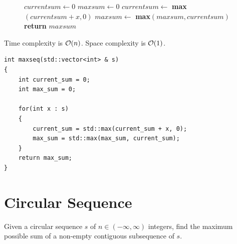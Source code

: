 \begin{s}
\begin{figure}
\begin{center}
\end{center}
\begin{algorithmic}[1]
    \State $currentsum \gets 0$
    \State $maxsum \gets 0$
        \State $currentsum \gets$ \textbf{max}$(currentsum + x, 0)$
        \State $maxsum \gets$ \textbf{max}$(maxsum, currentsum)$ 
    \EndFor
    \State \textbf{return} $maxsum$
\EndFunction
\end{algorithmic}
\end{figure}

Time complexity is $\mathcal{O}(n)$. Space complexity is $\mathcal{O}(1)$.

\begin{lstlisting}
int maxseq(std::vector<int> & s)
{
    int current_sum = 0;
    int max_sum = 0;

    for(int x : s)
    {
        current_sum = std::max(current_sum + x, 0);
        max_sum = std::max(max_sum, current_sum);
    }
    return max_sum;
}
\end{lstlisting}
\par \vspace{-1.2\baselineskip}
\qedhere
\end{s}


\section*{Circular Sequence}

\begin{p}\label{maxcircular:p1}
Given a circular sequence $s$ of $n \in (-\infty, \infty)$ integers, find the maximum possible sum of a non-empty contiguous subsequence of $s$.
\end{p}

